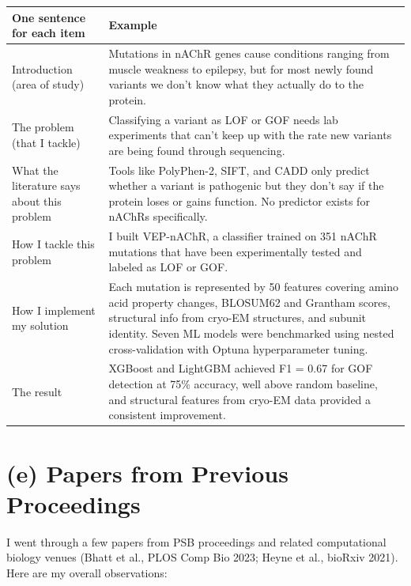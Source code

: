 \documentclass[12pt,a4paper]{article}
\begin{document}
\begin{table}[h!]
\centering
\renewcommand{\arraystretch}{1.5}
\begin{tabularx}{\textwidth}{|L{3.5cm}|X|}
\hline
\textbf{One sentence for each item} & \textbf{Example} \\
\hline
Introduction (area of study) &
Mutations in nAChR genes cause conditions ranging from muscle weakness to epilepsy, but for most newly found variants we don't know what they actually do to the protein. \\
\hline
The problem (that I tackle) &
Classifying a variant as LOF or GOF needs lab experiments that can't keep up with the rate new variants are being found through sequencing. \\
\hline
What the literature says about this problem &
Tools like PolyPhen-2, SIFT, and CADD only predict whether a variant is pathogenic but they don't say if the protein loses or gains function. No predictor exists for nAChRs specifically. \\
\hline
How I tackle this problem &
I built VEP-nAChR, a classifier trained on 351 nAChR mutations that have been experimentally tested and labeled as LOF or GOF. \\
\hline
How I implement my solution &
Each mutation is represented by 50 features covering amino acid property changes, BLOSUM62 and Grantham scores, structural info from cryo-EM structures, and subunit identity. Seven ML models were benchmarked using nested cross-validation with Optuna hyperparameter tuning. \\
\hline
The result &
XGBoost and LightGBM achieved F1 = 0.67 for GOF detection at 75\% accuracy, well above random baseline, and structural features from cryo-EM data provided a consistent improvement. \\
\hline
\end{tabularx}
\end{table}

\newpage

\section*{(e) Papers from Previous Proceedings}

I went through a few papers from PSB proceedings and related computational biology venues (Bhatt et al., PLOS Comp Bio 2023; Heyne et al., bioRxiv 2021). Here are my overall observations:
\end{document}
